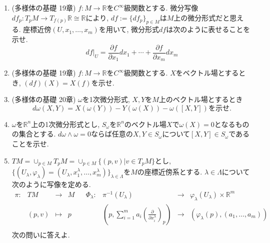 \documentclass[dvipdfmx,a4paper,11pt]{article}
\newcommand{\R}{\mathbb{R}}
\theoremstyle{definition}
\newcommand{\pdrv}[2]{\frac{\partial #1}{\partial #2}}
\begin{document}
\begin{enumerate}[label=\textbf{問}\ref*{sec-mfd-diff}.\arabic*]
\item (多様体の基礎 19章) $f : M \rightarrow \R$を$C^{\infty}$級関数とする. 微分写像$df_{p} : T_{p}M \rightarrow T_{f(p)}\R \cong \R$により, $df:= \{df_{p}\}_{p \in M}$は$M$上の微分形式だと思える.
 座標近傍$(U, x_1, \ldots, x_m)$を用いて, 微分形式$df$は次のように表せることを示せ. 
$$ df|_{U} = \pdrv{f}{x_1} dx_1 + \cdots + \pdrv{f}{x_m}dx_{m} $$ 

\item (多様体の基礎 19章) $f : M \rightarrow \R$を$C^{\infty}$級関数とする. 
$X$をベクトル場とするとき, $(df) (X) = X(f)$を示せ. 

\item (多様体の基礎 20章) $\omega$を1次微分形式, $X,Y$を$M$上のベクトル場とするとき$$d \omega(X,Y) = X(\omega(Y)) - Y(\omega(X)) -\omega([X,Y])\text{を示せ.}$$

\item $\omega$を$\R^n$上の1次微分形式とし, $S_{\omega}$を$\R^n$のベクトル場$X$で$\omega(X)=0$となるものの集合とする.  $d \omega \wedge \omega =0$ならば任意の$X,Y \in S_{\omega}$について$[X,Y] \in S_{\omega}$であることを示せ.

\item \label{tm_const } $TM = \cup_{p \in M}T_{p}M = \cup_{p \in M}\{ (p,v) | v \in T_{p}M\}$とし, $\{ (U_{\lambda}, \varphi_{\lambda})=(U_{\lambda}, x_{1}^{\lambda}, \ldots, x_{m}^{\lambda})\}_{\lambda \in \Lambda}$を$M$の座標近傍系とする. $\lambda \in \Lambda$について次のように写像を定める.
$$
\begin{matrix}
\pi :& TM &\rightarrow& M& &\Phi_{\lambda} :& \pi^{-1}(U_{\lambda})& \rightarrow& \varphi_{\lambda}(U_{\lambda}) \times \R^{m} \\
	& (p,v) &\mapsto& p& &					& (p, \sum_{i=1}^{m} a_{i} \left(\pdrv{}{x_{i}^{\lambda}}\right)_p)& \rightarrow& (\varphi_{\lambda}(p), (a_1, \ldots, a_{m})) \\
\end{matrix}
$$
次の問いに答えよ. 


\end{enumerate}
\end{document}
